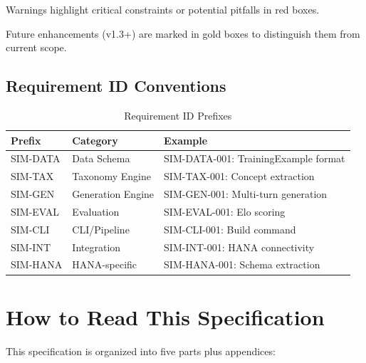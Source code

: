 \begin{warningbox}
Warnings highlight critical constraints or potential pitfalls in red boxes.
\end{warningbox}

\begin{futurebox}
Future enhancements (v1.3+) are marked in gold boxes to distinguish them from current scope.
\end{futurebox}

\subsection*{Requirement ID Conventions}

\begin{table}[h]
\centering
\begin{tabular}{@{}llp{6cm}@{}}
\toprule
\textbf{Prefix} & \textbf{Category} & \textbf{Example} \\
\midrule
SIM-DATA & Data Schema & SIM-DATA-001: TrainingExample format \\
SIM-TAX & Taxonomy Engine & SIM-TAX-001: Concept extraction \\
SIM-GEN & Generation Engine & SIM-GEN-001: Multi-turn generation \\
SIM-EVAL & Evaluation & SIM-EVAL-001: Elo scoring \\
SIM-CLI & CLI/Pipeline & SIM-CLI-001: Build command \\
SIM-INT & Integration & SIM-INT-001: HANA connectivity \\
SIM-HANA & HANA-specific & SIM-HANA-001: Schema extraction \\
\bottomrule
\end{tabular}
\caption{Requirement ID Prefixes}
\end{table}

\section*{How to Read This Specification}

This specification is organized into five parts plus appendices:

